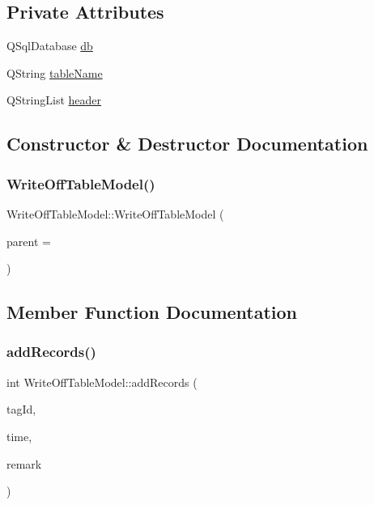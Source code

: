 \subsection*{Private Attributes}
\begin{DoxyCompactItemize}
\item 
Q\+Sql\+Database \mbox{\hyperlink{class_write_off_table_model_a872405c18e5f722ebbde4c34072f47f1}{db}}
\item 
Q\+String \mbox{\hyperlink{class_write_off_table_model_a07073c77e57b3a366ad2280e838d05ed}{table\+Name}}
\item 
Q\+String\+List \mbox{\hyperlink{class_write_off_table_model_ae5759dcf48c9986823561c3ca98179fd}{header}}
\end{DoxyCompactItemize}


\subsection{Constructor \& Destructor Documentation}
\mbox{\label{class_write_off_table_model_adb9a959b86ae39cd16910953961696c9}} 
\subsubsection{\texorpdfstring{WriteOffTableModel()}{WriteOffTableModel()}}
{\footnotesize\ttfamily Write\+Off\+Table\+Model\+::\+Write\+Off\+Table\+Model (\begin{DoxyParamCaption}\item[{Q\+Object $\ast$}]{parent = {} }\end{DoxyParamCaption})\hspace{0.3cm}{\ttfamily [explicit]}}



\subsection{Member Function Documentation}
\mbox{\label{class_write_off_table_model_a695b8631dc0a1cb72f306a4d8cd811f8}} 
\subsubsection{\texorpdfstring{addRecords()}{addRecords()}}
{\footnotesize\ttfamily int Write\+Off\+Table\+Model\+::add\+Records (\begin{DoxyParamCaption}\item[{Q\+String \&}]{tag\+Id,  }\item[{Q\+String \&}]{time,  }\item[{Q\+String \&}]{remark }\end{DoxyParamCaption})}



